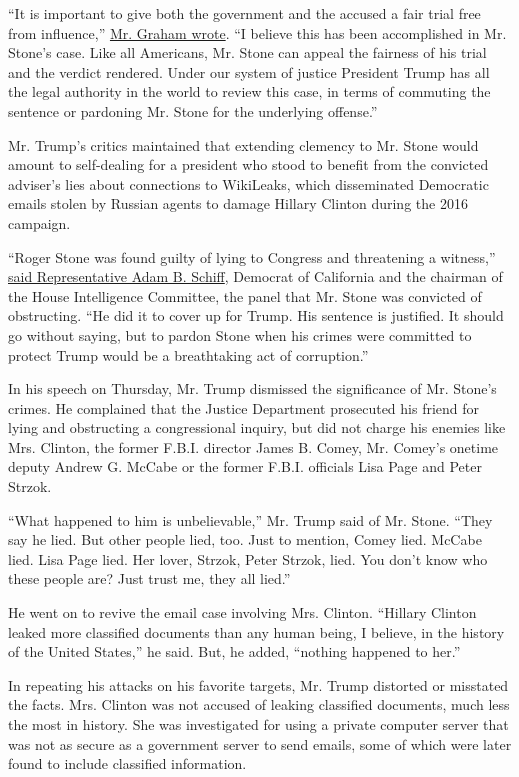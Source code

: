 ``It is important to give both the government and the accused a fair
trial free from influence,''
\href{https://twitter.com/LindseyGrahamSC/status/1230555883660288000}{Mr.
Graham wrote}. ``I believe this has been accomplished in Mr. Stone's
case. Like all Americans, Mr. Stone can appeal the fairness of his trial
and the verdict rendered. Under our system of justice President Trump
has all the legal authority in the world to review this case, in terms
of commuting the sentence or pardoning Mr. Stone for the underlying
offense.''

Mr. Trump's critics maintained that extending clemency to Mr. Stone
would amount to self-dealing for a president who stood to benefit from
the convicted adviser's lies about connections to WikiLeaks, which
disseminated Democratic emails stolen by Russian agents to damage
Hillary Clinton during the 2016 campaign.

``Roger Stone was found guilty of lying to Congress and threatening a
witness,''
\href{https://twitter.com/RepAdamSchiff/status/1230550196590796800}{said
Representative Adam B. Schiff}, Democrat of California and the chairman
of the House Intelligence Committee, the panel that Mr. Stone was
convicted of obstructing. ``He did it to cover up for Trump. His
sentence is justified. It should go without saying, but to pardon Stone
when his crimes were committed to protect Trump would be a breathtaking
act of corruption.''

In his speech on Thursday, Mr. Trump dismissed the significance of Mr.
Stone's crimes. He complained that the Justice Department prosecuted his
friend for lying and obstructing a congressional inquiry, but did not
charge his enemies like Mrs. Clinton, the former F.B.I. director James
B. Comey, Mr. Comey's onetime deputy Andrew G. McCabe or the former
F.B.I. officials Lisa Page and Peter Strzok.

``What happened to him is unbelievable,'' Mr. Trump said of Mr. Stone.
``They say he lied. But other people lied, too. Just to mention, Comey
lied. McCabe lied. Lisa Page lied. Her lover, Strzok, Peter Strzok,
lied. You don't know who these people are? Just trust me, they all
lied.''

He went on to revive the email case involving Mrs. Clinton. ``Hillary
Clinton leaked more classified documents than any human being, I
believe, in the history of the United States,'' he said. But, he added,
``nothing happened to her.''

In repeating his attacks on his favorite targets, Mr. Trump distorted or
misstated the facts. Mrs. Clinton was not accused of leaking classified
documents, much less the most in history. She was investigated for using
a private computer server that was not as secure as a government server
to send emails, some of which were later found to include classified
information.

